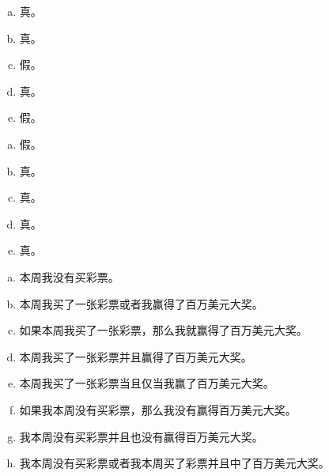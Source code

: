{{        %
        \begin{practices}
            \begin{enumerate}[a)]
                \item 真。
                \item 真。
                \item 假。
                \item 真。
                \item 假。
            \end{enumerate}
        \end{practices}

        \begin{practices}
            \begin{enumerate}[a)]
                \item 假。
                \item 真。
                \item 真。
                \item 真。
                \item 真。
            \end{enumerate}
        \end{practices}

        \begin{practices}
            \begin{enumerate}[a)]
                \item 本周我没有买彩票。
                \item 本周我买了一张彩票或者我赢得了百万美元大奖。
                \item 如果本周我买了一张彩票，那么我就赢得了百万美元大奖。
                \item 本周我买了一张彩票并且赢得了百万美元大奖。
                \item 本周我买了一张彩票当且仅当我赢了百万美元大奖。
                \item 如果我本周没有买彩票，那么我没有赢得百万美元大奖。
                \item 我本周没有买彩票并且也没有赢得百万美元大奖。
                \item 我本周没有买彩票或者我本周买了彩票并且中了百万美元大奖。
            \end{enumerate}
        \end{practices}

}}

